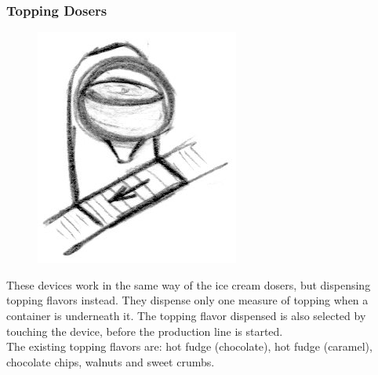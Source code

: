 \documentclass[a4paper]{scrartcl}
\begin{document}
        \subsubsection{Topping Dosers}
            \begin{minipage}[t][7em][t]{\textwidth}
                \begin{figure}
                    \vspace{-20pt}
                    \includegraphics[scale=1]{devices/topping_doser}
                    \vspace{-10pt}
                \end{figure}

                These devices work in the same way of the ice cream dosers, but
                dispensing topping flavors instead. They dispense only one
                measure of topping when a container is underneath it. The
                topping flavor dispensed is also selected by touching the
                device, before the production line is started.
                \\
                The existing topping flavors are: hot fudge (chocolate), hot
                fudge (caramel), chocolate chips, walnuts and sweet crumbs.
            \end{minipage}
\end{document}
